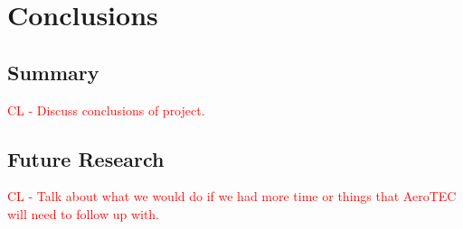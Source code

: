 \section{Conclusions}
\label{sec:Conclusions}

\subsection{Summary}
\textcolor{red}{CL  - Discuss conclusions of project.}


\subsection{Future Research}
\textcolor{red}{CL - Talk about what we would do if we had more time or things that AeroTEC will need to follow up with.}

